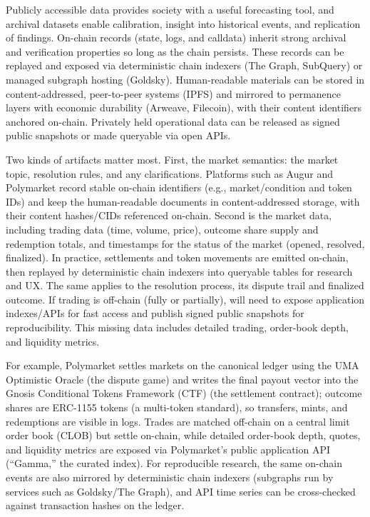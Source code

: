 Publicly accessible \depm data provides society with a useful forecasting tool, and archival datasets enable calibration, insight into historical events, and replication of findings. On-chain records (state, logs, and calldata) inherit strong archival and verification properties so long as the chain persists. These records can be replayed and exposed via deterministic chain indexers (\eg The Graph, SubQuery) or managed subgraph hosting (\eg Goldsky). Human-readable materials can be stored in content-addressed, peer-to-peer systems (\eg IPFS) and mirrored to permanence layers with economic durability (\eg Arweave, Filecoin), with their content identifiers anchored on-chain. Privately held operational data can be released as signed public snapshots or made queryable via open APIs.

Two kinds of artifacts matter most. First, the market semantics: the market topic, resolution rules, and any clarifications. Platforms such as Augur and Polymarket record stable on-chain identifiers (e.g., market/condition and token IDs) and keep the human-readable documents in content-addressed storage, with their content hashes/CIDs referenced on-chain. Second is the market data, including trading data (time, volume, price), outcome share supply and redemption totals, and timestamps for the status of the market (\eg opened, resolved, finalized). In practice, settlements and token movements are emitted on-chain, then replayed by deterministic chain indexers into queryable tables for research and UX. The same applies to the resolution process, its dispute trail and finalized outcome. If trading is off-chain (fully or partially), \depms will need to expose application indexes/APIs for fast access and publish signed public snapshots for reproducibility. This missing data includes detailed trading, order-book depth, and liquidity metrics.

For example, Polymarket settles markets on the canonical ledger using the UMA Optimistic Oracle (the dispute game) and writes the final payout vector into the Gnosis Conditional Tokens Framework (CTF) (the settlement contract); outcome shares are ERC-1155 tokens (a multi-token standard), so transfers, mints, and redemptions are visible in logs. Trades are matched off-chain on a central limit order book (CLOB) but settle on-chain, while detailed order-book depth, quotes, and liquidity metrics are exposed via Polymarket’s public application API (“Gamma,” the curated index). For reproducible research, the same on-chain events are also mirrored by deterministic chain indexers (subgraphs run by services such as Goldsky/The Graph), and API time series can be cross-checked against transaction hashes on the ledger.

